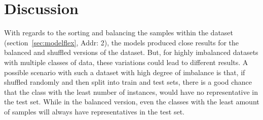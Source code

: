 \chapter{Discussion}
With regards to the sorting and balancing the samples within the dataset 
(section~\ref{sec:modelflex}, Addr: 2), the models produced close results for the balanced and shuffled 
versions of the dataset. But, for highly imbalanced datasets with multiple classes of data, 
these variations could lead to different results. 
A possible scenario with such a dataset with high degree of imbalance is that, if shuffled randomly 
and then split into train and test sets, there is a good chance that the class with the 
least number of instances, would have no representative in the test set. While in the balanced 
version, even the classes with the least amount of samples will always have representatives in the 
test set. 